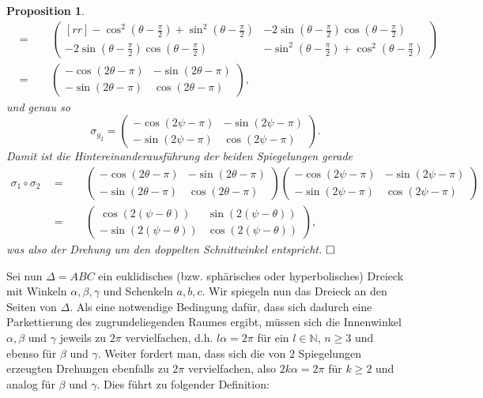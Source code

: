 \documentclass[11pt]{book}
\numberwithin{dummy}{section}
\newtheorem{proposition}[theorem]{Proposition}
\theoremstyle{nonumberbreak}
\newenvironment{pr}[1][]{\ifthenelse{\equal{#1}{}}{\proof}{\proof[#1]}\rm}{\endproof}
\begin{document}
\begin{spacing}{1.4}
\begin{proposition}
\begin{pr}
\begin{alignat*}{5}
&=&& \ \ \begin{pmatrix}[rr] - \cos^2\left( \theta - \frac{\pi}{2}\right) + \sin^2 \left( \theta - \frac{\pi}{2}\right) & - 2 \sin \left( \theta - \frac{\pi}{2}\right) \cos \left( \theta - \frac{\pi}{2}\right) \\ - 2 \sin \left( \theta - \frac{\pi}{2}\right) \cos \left( \theta - \frac{\pi}{2}\right) & - \sin^2 \left( \theta - \frac{\pi}{2}\right) + \cos^2\left( \theta - \frac{\pi}{2}\right) \end{pmatrix} \\
&=&& \ \ \begin{pmatrix} - \cos (2\theta - \pi) & -\sin ( 2 \theta - \pi) \\ - \sin (2 \theta - \pi) & \cos (2\theta - \pi) \end{pmatrix},
\end{alignat*}
und genau so 
$$\sigma_{g_2}=\begin{pmatrix} - \cos (2\psi - \pi) & -\sin ( 2 \psi - \pi) \\ - \sin (2 \psi- \pi) & \cos (2\psi - \pi) \end{pmatrix}.$$
Damit ist die Hintereinanderausführung der beiden Spiegelungen gerade
\begin{alignat*}{5}
\sigma_1 \circ \sigma_2 \ \ &=&& \ \ \begin{pmatrix} - \cos (2\theta - \pi) & -\sin ( 2 \theta - \pi) \\ - \sin (2 \theta - \pi) & \cos (2\theta - \pi) \end{pmatrix}\begin{pmatrix} - \cos (2\psi - \pi) & -\sin ( 2 \psi - \pi) \\ - \sin (2 \psi- \pi) & \cos (2\psi - \pi) \end{pmatrix}\\
&=&& \ \ \begin{pmatrix} \cos(2 (\psi - \theta)) & \sin( 2(\psi - \theta)) \\ -\sin(2(\psi-\theta)) & \cos(2 (\psi-\theta)) \end{pmatrix},
\end{alignat*}
was also der Drehung um den doppelten Schnittwinkel entspricht. $\hfill \Box$

\end{pr}

\end{proposition}



Sei nun $\Delta = ABC$ ein euklidisches (bzw. sphärisches oder hyperbolisches) Dreieck mit Winkeln $\alpha, \beta, \gamma$ und Schenkeln $a,b,c$. Wir spiegeln nun das Dreieck an den Seiten von $\Delta$. Als eine notwendige Bedingung dafür, dass sich dadurch eine Parkettierung des zugrundeliegenden Raumes ergibt, müssen sich die Innenwinkel $\alpha, \beta$ und $\gamma$ jeweils zu $2 \pi$ vervielfachen, d.h. $l \alpha = 2\pi$ für ein $l \in \mathbb{N}$, $n \geqslant 3$ und ebenso für $\beta$ und $\gamma$. Weiter fordert man, dass sich die von $2$ Spiegelungen erzeugten Drehungen ebenfalls zu $2\pi$ vervielfachen, also $2k \alpha = 2 \pi$ für $k \geqslant 2$ und analog für $\beta$ und $\gamma$. Dies führt zu folgender Definition:


\end{spacing}
\end{document}
